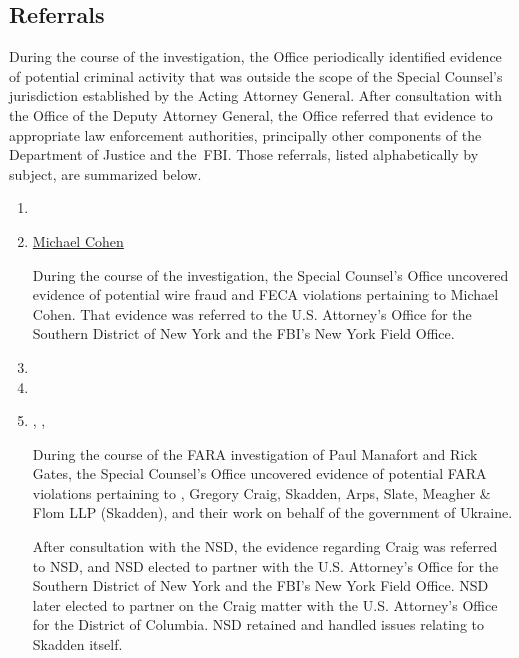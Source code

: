 \subsection{Referrals}

During the course of the investigation, the Office periodically identified evidence of potential criminal activity that was outside the scope of the Special Counsel's jurisdiction established by the Acting Attorney General.
After consultation with the Office of the Deputy Attorney General, the Office referred that evidence to appropriate law enforcement authorities, principally other components of the Department of Justice and the~FBI\null.
Those referrals, listed alphabetically by subject, are summarized below.

\begin{enumerate}[1.]

    \item {}


    \item \underline{Michael Cohen}

During the course of the investigation, the Special Counsel's Office uncovered evidence of potential wire fraud and FECA violations pertaining to Michael Cohen.
That evidence was referred to the U.S. Attorney's Office for the Southern District of New York and the FBI's New York Field Office.

    \item {}


    \item {}


    \item {}, , \hfil\break{}

During the course of the FARA investigation of Paul Manafort and Rick Gates, the Special Counsel's Office uncovered evidence of potential FARA violations pertaining to , Gregory Craig, Skadden, Arps, Slate, Meagher \& Flom LLP (Skadden), and their work on behalf of the government of Ukraine.

After consultation with the NSD, the evidence regarding Craig  was referred to NSD, and NSD elected to partner with the U.S. Attorney's Office for the Southern District of New York and the FBI's New York Field Office.
NSD later elected to partner on the Craig matter with the U.S. Attorney's Office for the District of Columbia.
NSD retained and handled issues relating to Skadden itself.


\end{enumerate}
